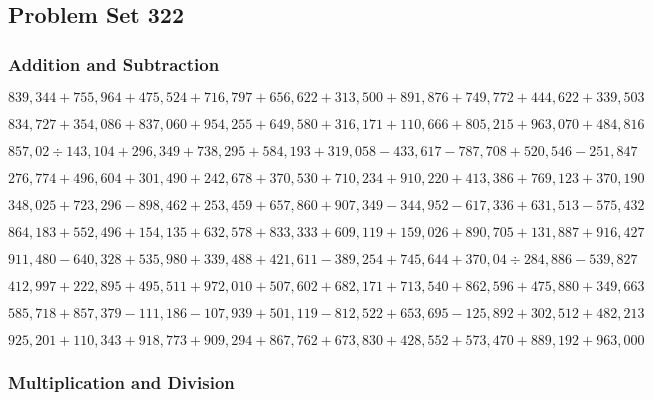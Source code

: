 \hypertarget{problem-set-322}{%
\subsection{Problem Set 322}\label{problem-set-322}}

\hypertarget{addition-and-subtraction}{%
\subsubsection{Addition and
Subtraction}\label{addition-and-subtraction}}

\(839,344+755,964+475,524+716,797+656,622+313,500+891,876+749,772+444,622+339,503\)

\(834,727+354,086+837,060+954,255+649,580+316,171+110,666+805,215+963,070+484,816\)

\(857,02÷143,104+296,349+738,295+584,193+319,058-433,617-787,708+520,546-251,847\)

\(276,774+496,604+301,490+242,678+370,530+710,234+910,220+413,386+769,123+370,190\)

\(348,025+723,296-898,462+253,459+657,860+907,349-344,952-617,336+631,513-575,432\)

\(864,183+552,496+154,135+632,578+833,333+609,119+159,026+890,705+131,887+916,427\)

\(911,480-640,328+535,980+339,488+421,611-389,254+745,644+370,04÷284,886-539,827\)

\(412,997+222,895+495,511+972,010+507,602+682,171+713,540+862,596+475,880+349,663\)

\(585,718+857,379-111,186-107,939+501,119-812,522+653,695-125,892+302,512+482,213\)

\(925,201+110,343+918,773+909,294+867,762+673,830+428,552+573,470+889,192+963,000\)

\hypertarget{multiplication-and-division}{%
\subsubsection{Multiplication and
Division}\label{multiplication-and-division}}

